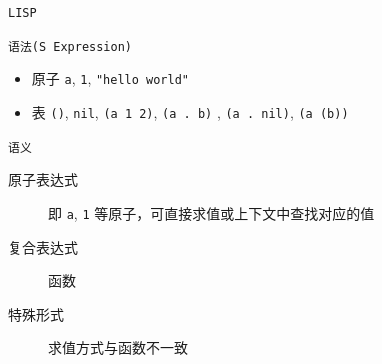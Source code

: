 \documentclass[presentation, bigger]{beamer}
\begin{document}
\begin{frame}[fragile,label={sec:org17ed4b8}]{\texttt{LISP}}
 \begin{block}{\texttt{语法(S Expression)}}
\begin{itemize}
\item 原子 \texttt{a}, \texttt{1}, \texttt{"hello world"}
\item 表 \texttt{()}, \texttt{nil}, \texttt{(a 1 2)}, \texttt{(a . b)} , \texttt{(a . nil)}, \texttt{(a (b))}
\end{itemize}
\end{block}
\begin{block}{\texttt{语义}}
\begin{description}
\item[{原子表达式}] 即 \texttt{a}, \texttt{1} 等原子，可直接求值或上下文中查找对应的值
\item[{复合表达式}] 函数
\item[{特殊形式}] 求值方式与函数不一致
\end{description}
\end{block}
\end{frame}
\end{document}
